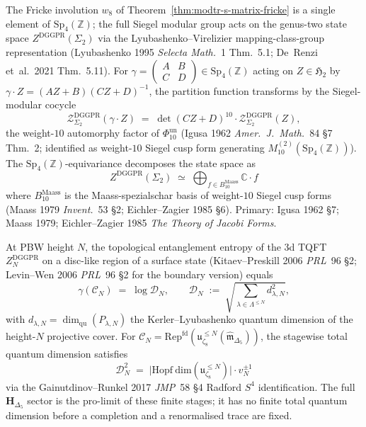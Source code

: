\begin{remark}
\label{rem:modtr-sp4-modularity}
The Fricke involution $w_8$ of
Theorem~\ref{thm:modtr-s-matrix-fricke} is a single element
of $\mathrm{Sp}_4(\mathbb Z)$; the full Siegel modular group acts on
the genus-two state space $Z^{\mathrm{DGGPR}}(\Sigma_2)$ via the
Lyubashenko--Virelizier mapping-class-group representation
(Lyubashenko 1995 \emph{Selecta Math.}~1 Thm.~5.1;
De~Renzi et~al.\ 2021 Thm.~5.11). For
$\gamma = \left(\begin{smallmatrix}A&B\\C&D\end{smallmatrix}\right)\in
\mathrm{Sp}_4(\mathbb Z)$ acting on $Z\in\mathfrak H_2$ by
$\gamma\cdot Z = (AZ+B)(CZ+D)^{-1}$, the partition function
transforms by the Siegel-modular cocycle
\[
 \mathcal Z^{\mathrm{DGGPR}}_{\Sigma_2}(\gamma\cdot Z)
 \;=\;
 \det(CZ+D)^{10}\cdot
 \mathcal Z^{\mathrm{DGGPR}}_{\Sigma_2}(Z),
\]
the weight-$10$ automorphy factor of $\Phi_{10}^{\mathrm{un}}$
(Igusa 1962 \emph{Amer.\ J.\ Math.}~84 \S7 Thm.~2; identified as
weight-$10$ Siegel cusp form generating $M^{(2)}_{10}(\mathrm{Sp}_4(\mathbb Z))$).
The $\mathrm{Sp}_4(\mathbb Z)$-equivariance decomposes the state
space as
\[
 Z^{\mathrm{DGGPR}}(\Sigma_2)
 \;\simeq\;
 \bigoplus_{f\in B_{10}^{\mathrm{Maass}}}
 \mathbb C\cdot f
\]
where $B_{10}^{\mathrm{Maass}}$ is the Maass-spezialschar basis of
weight-$10$ Siegel cusp forms
(Maass 1979 \emph{Invent.}~53 \S 2; Eichler--Zagier 1985 \S 6).
Primary: Igusa 1962 \S7; Maass 1979; Eichler--Zagier 1985
\emph{The Theory of Jacobi Forms}.
\end{remark}

\begin{theorem}
\label{thm:modtr-topological-entanglement}
At PBW height \(N\), the topological entanglement entropy of the
3d TQFT \(Z^{\mathrm{DGGPR}}_N\) on a disc-like region of a surface state
(Kitaev--Preskill 2006 \emph{PRL}~96 \S 2; Levin--Wen 2006 \emph{PRL}~96
\S 2 for the boundary version) equals
\[
 \gamma(\mathcal C_N)
 \;=\;
 \log\mathcal D_N,
 \qquad
 \mathcal D_N
 \;:=\;
 \sqrt{\sum_{\lambda\in\Lambda^{\leq N}} d_{\lambda,N}^2},
\]
with \(d_{\lambda,N} = \dim_{\mathrm{qu}}(P_{\lambda,N})\) the
Kerler--Lyubashenko quantum dimension of the height-\(N\) projective
cover. For
\(\mathcal C_N =
\mathrm{Rep}^{\mathrm{fd}}(\mathfrak u_{\zeta_8}^{\leq N}
(\widehat{\mathfrak m}_{\Delta_5}))\), the stagewise total quantum
dimension satisfies
\[
 \mathcal D_N^2
 \;=\;
 \bigl|\mathrm{Hopf\ dim}(\mathfrak u_{\zeta_8}^{\leq N})\bigr|
 \cdot v_N^{\pm 1}
\]
via the Gainutdinov--Runkel 2017 \emph{JMP}~58 \S 4 Radford $S^4$
identification.  The full \(\mathbf H_{\Delta_5}\) sector is the
pro-limit of these finite stages; it has no finite total quantum
dimension before a completion and a renormalised trace are fixed.
\end{theorem}

